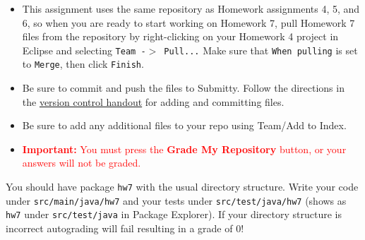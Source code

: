 \documentclass[11pt]{article}
\begin{document}
\noindent{}
\par


\begin{itemize}
\item  
This assignment uses the same repository as Homework assignments 4, 5, and 6, so when you are ready to start working on Homework 7, pull Homework 7 files from the repository by right-clicking on your Homework 4 project in Eclipse and selecting \texttt{Team -$>$ Pull...} Make sure that \texttt{When pulling} is set to \texttt{Merge}, then click \texttt{Finish}.

\item
Be sure to commit and push the files to Submitty. Follow the directions in the \href{https://www.cs.rpi.edu/academics/courses/spring23/csci2600/Documents/eclipse_and_git.pdf}{version control handout} for adding and committing files.

\item
Be sure to add any additional files to your repo using Team/Add to Index.

\item
\textcolor{red}{\textbf{Important:} You must press the \textbf{Grade My Repository} button, or your answers will not be graded.}
\end{itemize}

\newline

\noindent You should have package 
\texttt{hw7} with the usual directory structure. Write your code under \texttt{src/main/java/hw7} and your tests under \texttt{src/test/java/hw7} (shows as \texttt{hw7} under \texttt{src/test/java} in Package Explorer). If your directory structure is incorrect autograding will fail resulting in a grade of 0!

\newline
\end{document}
